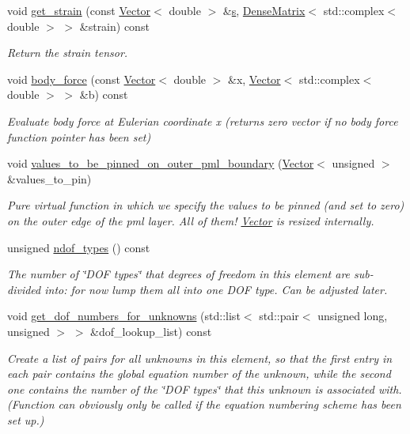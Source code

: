 \begin{DoxyCompactItemize}
void \hyperlink{classoomph_1_1PMLTimeHarmonicLinearElasticityEquationsBase_a3f9212801628695a4babc5f0b3579bc1}{get\+\_\+strain} (const \hyperlink{classoomph_1_1Vector}{Vector}$<$ double $>$ \&\hyperlink{cfortran_8h_ab7123126e4885ef647dd9c6e3807a21c}{s}, \hyperlink{classoomph_1_1DenseMatrix}{Dense\+Matrix}$<$ std\+::complex$<$ double $>$ $>$ \&strain) const
\begin{DoxyCompactList}\small\item\em Return the strain tensor. \end{DoxyCompactList}\item 
void \hyperlink{classoomph_1_1PMLTimeHarmonicLinearElasticityEquationsBase_ae2f78d99ea705a3df9f8d2f6f952eb90}{body\+\_\+force} (const \hyperlink{classoomph_1_1Vector}{Vector}$<$ double $>$ \&x, \hyperlink{classoomph_1_1Vector}{Vector}$<$ std\+::complex$<$ double $>$ $>$ \&b) const
\begin{DoxyCompactList}\small\item\em Evaluate body force at Eulerian coordinate x (returns zero vector if no body force function pointer has been set) \end{DoxyCompactList}\item 
void \hyperlink{classoomph_1_1PMLTimeHarmonicLinearElasticityEquationsBase_a0c3e98b10a79cfbe3849cfdafff1dde2}{values\+\_\+to\+\_\+be\+\_\+pinned\+\_\+on\+\_\+outer\+\_\+pml\+\_\+boundary} (\hyperlink{classoomph_1_1Vector}{Vector}$<$ unsigned $>$ \&values\+\_\+to\+\_\+pin)
\begin{DoxyCompactList}\small\item\em Pure virtual function in which we specify the values to be pinned (and set to zero) on the outer edge of the pml layer. All of them! \hyperlink{classoomph_1_1Vector}{Vector} is resized internally. \end{DoxyCompactList}\item 
unsigned \hyperlink{classoomph_1_1PMLTimeHarmonicLinearElasticityEquationsBase_a5d0b3ed720b44499cf9e174c8d46b040}{ndof\+\_\+types} () const
\begin{DoxyCompactList}\small\item\em The number of \char`\"{}\+D\+O\+F types\char`\"{} that degrees of freedom in this element are sub-\/divided into\+: for now lump them all into one D\+OF type. Can be adjusted later. \end{DoxyCompactList}\item 
void \hyperlink{classoomph_1_1PMLTimeHarmonicLinearElasticityEquationsBase_a99ebd7d2a04356e12bf02630e89c8836}{get\+\_\+dof\+\_\+numbers\+\_\+for\+\_\+unknowns} (std\+::list$<$ std\+::pair$<$ unsigned long, unsigned $>$ $>$ \&dof\+\_\+lookup\+\_\+list) const
\begin{DoxyCompactList}\small\item\em Create a list of pairs for all unknowns in this element, so that the first entry in each pair contains the global equation number of the unknown, while the second one contains the number of the \char`\"{}\+D\+O\+F types\char`\"{} that this unknown is associated with. (Function can obviously only be called if the equation numbering scheme has been set up.) \end{DoxyCompactList}\end{DoxyCompactItemize}
